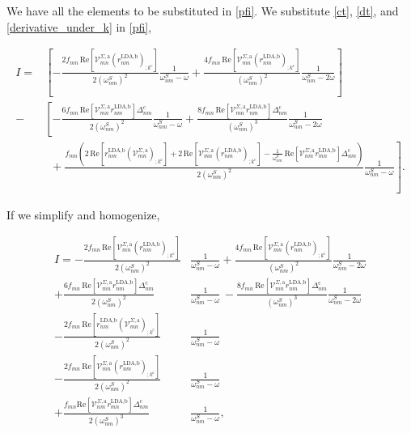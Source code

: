 \documentclass[10pt]{article}
\begin{document}
We have all the elements to be substituted in \eqref{pfi}. We substitute \eqref{ct}, \eqref{dt}, and \eqref{derivative_under_k} in \eqref{pfi},

\begin{align*}
I
= &\left[-\frac{2f_{mn}\,\mathrm{Re}\left[\mathcal{V}^{\Sigma,\text{a}}_{mn}\left(r^{\text{LDA,b}}_{nm}\right)_{;k^{\text{c}}}\right]}{2(\omega^{S}_{nm})^{2}}\frac{1}{\omega^{S}_{nm}-\omega} + \frac{4f_{mn}\,\mathrm{Re}\left[\mathcal{V}^{\Sigma,\text{a}}_{mn}\left(r^{\text{LDA,b}}_{nm}\right)_{;k^{\text{c}}}\right]}{(\omega^{S}_{nm})^{2}}\frac{1}{\omega^{S}_{nm}-2\omega}\right]\nonumber\\
- &\left[-\frac{6f_{mn}\,\mathrm{Re}\left[\mathcal{V}^{\Sigma,\text{a}}_{mn}r^{\text{LDA,b}}_{nm}\right]\Delta^{\text{c}}_{nm}}{2(\omega^{S}_{nm})^{2}}\frac{1}{\omega^{S}_{nm}-\omega} 
+ \frac{8f_{mn}\,\mathrm{Re}\left[\mathcal{V}^{\Sigma,\text{a}}_{mn}r^{\text{LDA,b}}_{nm}\right]\Delta^{\text{c}}_{nm}}{(\omega^{S}_{nm})^{3}}\frac{1}{\omega^{S}_{nm}-2\omega}\right.\nonumber\\
&\,\,\,+ \left.\frac{f_{mn}\left(2\,\mathrm{Re}\left[r^{\text{LDA,b}}_{nm}\left(\mathcal{V}^{\Sigma,\text{a}}_{mn}\right)_{;k^{\text{c}}}\right] + 2\,\mathrm{Re}\left[\mathcal{V}^{\Sigma,\text{a}}_{mn}\left(r^{\text{LDA,b}}_{nm}\right)_{;k^{\text{c}}}\right] - \frac{1}{\omega^{S}_{nm}}\,\mathrm{Re}\left[\mathcal{V}^{\Sigma,\text{a}}_{nm}r^{\text{LDA,b}}_{mn}\right]\Delta_{nm}^{\text{c}}\right)}{2(\omega^{S}_{nm})^{2}}\frac{1}{\omega^S_{nm}-\omega}\right].
\end{align*}

If we simplify and homogenize,

\begin{align}\label{simplified_i} 
I =
-\frac{2f_{mn}\,\mathrm{Re}\left[\mathcal{V}^{\Sigma,\text{a}}_{mn}\left(r^{\text{LDA,b}}_{nm}\right)_{;k^{\text{c}}}\right]}{2(\omega^{S}_{nm})^{2}}&\frac{1}{\omega^{S}_{nm}-\omega}
+ \frac{4f_{mn}\,\mathrm{Re}\left[\mathcal{V}^{\Sigma,\text{a}}_{mn}\left(r^{\text{LDA,b}}_{nm}\right)_{;k^{\text{c}}}\right]}{(\omega^{S}_{nm})^{2}}\frac{1}{\omega^{S}_{nm}-2\omega}\nonumber\\
+ \frac{6f_{mn}\,\mathrm{Re}\left[\mathcal{V}^{\Sigma,\text{a}}_{mn}r^{\text{LDA,b}}_{nm}\right]\Delta^{\text{c}}_{nm}}{2(\omega^{S}_{nm})^{2}}&\frac{1}{\omega^{S}_{nm}-\omega} 
\,- \frac{8f_{mn}\,\mathrm{Re}\left[\mathcal{V}^{\Sigma,\text{a}}_{mn}r^{\text{LDA,b}}_{nm}\right]\Delta^{\text{c}}_{nm}}{(\omega^{S}_{nm})^{3}}\frac{1}{\omega^{S}_{nm}-2\omega}\nonumber\\
- \frac{2f_{mn}\,\mathrm{Re}\left[r^{\text{LDA,b}}_{nm}\left(\mathcal{V}^{\Sigma,\text{a}}_{mn}\right)_{;k^{\text{c}}}\right]}{2(\omega^{S}_{nm})^{2}}&\frac{1}{\omega^{S}_{nm}-\omega}\nonumber\\
- \frac{2f_{mn}\,\mathrm{Re}\left[\mathcal{V}^{\Sigma,\text{a}}_{mn}\left(r^{\text{LDA,b}}_{nm}\right)_{;k^{\text{c}}}\right]}{2(\omega^{S}_{nm})^{2}}&\frac{1}{\omega^{S}_{nm}-\omega}\nonumber\\
+ \frac{f_{mn}\mathrm{Re}\left[\mathcal{V}^{\Sigma,\text{a}}_{nm}r^{\text{LDA,b}}_{mn}\right]\Delta_{nm}^{\text{c}}}{2(\omega^{S}_{nm})^{3}}&\frac{1}{\omega^{S}_{nm}-\omega},
\end{align}
\end{document}
